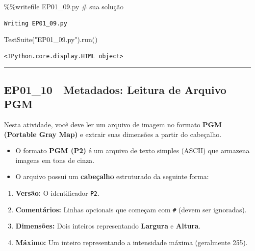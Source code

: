 \documentclass[
  portuguese,
  letterpaper,
  openany,
  oneside,
  12pt,
  a4paper]{book}
\newenvironment{Shaded}{\begin{snugshade}}{\end{snugshade}}
\newcommand{\CommentTok}[1]{\textcolor[rgb]{0.37,0.37,0.37}{#1}}
\newcommand{\NormalTok}[1]{\textcolor[rgb]{0.00,0.23,0.31}{#1}}
\newcommand{\OperatorTok}[1]{\textcolor[rgb]{0.37,0.37,0.37}{#1}}
\newcommand{\StringTok}[1]{\textcolor[rgb]{0.13,0.47,0.30}{#1}}
\providecommand{\tightlist}{%
  \setlength{\itemsep}{0pt}\setlength{\parskip}{0pt}}
\begin{document}
\begin{Shaded}
\begin{Highlighting}[]
\OperatorTok{\%\%}\NormalTok{writefile EP01\_09.py}
\CommentTok{\# sua solução}
\end{Highlighting}
\end{Shaded}

\begin{verbatim}
Writing EP01_09.py
\end{verbatim}

\begin{Shaded}
\begin{Highlighting}[]
\NormalTok{TestSuite(}\StringTok{"EP01\_09.py"}\NormalTok{).run()}
\end{Highlighting}
\end{Shaded}

\begin{verbatim}
<IPython.core.display.HTML object>
\end{verbatim}

\begin{center}\rule{0.5\linewidth}{0.5pt}\end{center}

\subsection{EP01\_10 📄 Metadados: Leitura de Arquivo
PGM}\label{ep01_10-metadados-leitura-de-arquivo-pgm}

Nesta atividade, você deve ler um arquivo de imagem no formato
\textbf{PGM (Portable Gray Map)} e extrair suas dimensões a partir do
cabeçalho.

\begin{itemize}
\tightlist
\item
  O formato \textbf{PGM (P2)} é um arquivo de texto simples (ASCII) que
  armazena imagens em tons de cinza.
\item
  O arquivo possui um \textbf{cabeçalho} estruturado da seguinte forma:
\end{itemize}

\begin{enumerate}
\def\labelenumi{\arabic{enumi}.}
\tightlist
\item
  \textbf{Versão:} O identificador \texttt{P2}.
\item
  \textbf{Comentários:} Linhas opcionais que começam com \texttt{\#}
  (devem ser ignoradas).
\item
  \textbf{Dimensões:} Dois inteiros representando \textbf{Largura} e
  \textbf{Altura}.
\item
  \textbf{Máximo:} Um inteiro representando a intensidade máxima
  (geralmente 255).
\end{enumerate}
\end{document}
